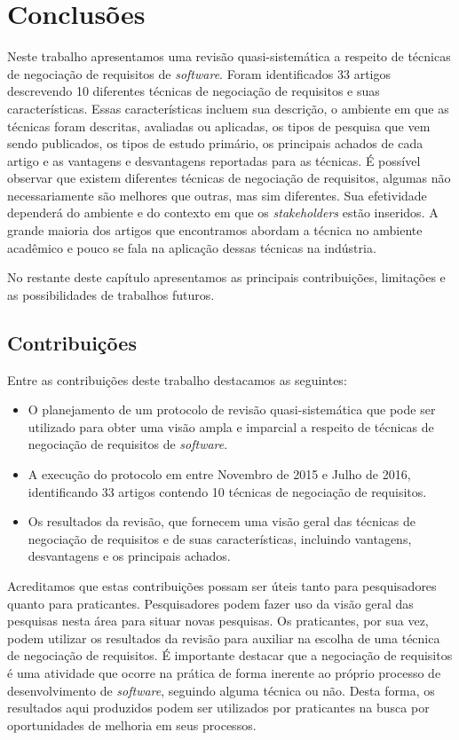\chapter{Conclusões}\label{cap:conclusoes}

Neste trabalho apresentamos uma revisão quasi-sistemática a respeito de técnicas
de negociação de requisitos de \textit{software}. Foram  identificados  33 
artigos  descrevendo  10  diferentes  técnicas de negociação de requisitos e
suas características. Essas características incluem sua descrição, o ambiente em
que as técnicas foram descritas, avaliadas ou aplicadas, os tipos de pesquisa
que vem sendo publicados, os tipos de estudo primário, os principais achados de
cada artigo e as vantagens e desvantagens reportadas para as técnicas. É possível observar que existem diferentes técnicas de negociação de requisitos, algumas não necessariamente são melhores que outras, mas sim diferentes. Sua efetividade dependerá do ambiente e do contexto em que os \textit{stakeholders} estão inseridos. A grande maioria dos artigos que encontramos abordam a técnica no ambiente acadêmico e pouco se fala na aplicação dessas técnicas na indústria.

No restante deste capítulo apresentamos as principais contribuições, limitações e as possibilidades de trabalhos futuros.

\section{Contribuições}
Entre as contribuições deste trabalho destacamos as seguintes:

\begin{itemize}
\setlength{\itemsep}{1pt}
\setlength{\itemindent}{20pt}
\item O planejamento de um protocolo de revisão quasi-sistemática que pode ser utilizado para obter uma visão ampla e imparcial a respeito de técnicas de negociação de requisitos de \textit{software}.
\item A execução do protocolo em entre Novembro de 2015 e Julho de 2016, identificando 33 artigos contendo 10 técnicas de negociação de requisitos.
\item Os resultados da revisão, que fornecem uma visão geral das técnicas de negociação de requisitos e de suas características, incluindo vantagens, desvantagens e os principais achados.
\end{itemize} 

Acreditamos que estas contribuições possam ser úteis tanto para pesquisadores quanto para praticantes. Pesquisadores podem fazer uso da visão geral das pesquisas nesta área para situar novas pesquisas.
Os praticantes, por sua vez, podem utilizar os resultados da revisão para auxiliar na escolha de uma técnica de negociação de requisitos. É importante destacar que a negociação de requisitos é uma atividade 
que ocorre na prática de forma inerente ao próprio processo de desenvolvimento de \textit{software}, seguindo alguma técnica ou não. Desta forma, os resultados aqui produzidos podem ser utilizados por praticantes na 
busca por oportunidades de melhoria em seus processos.

